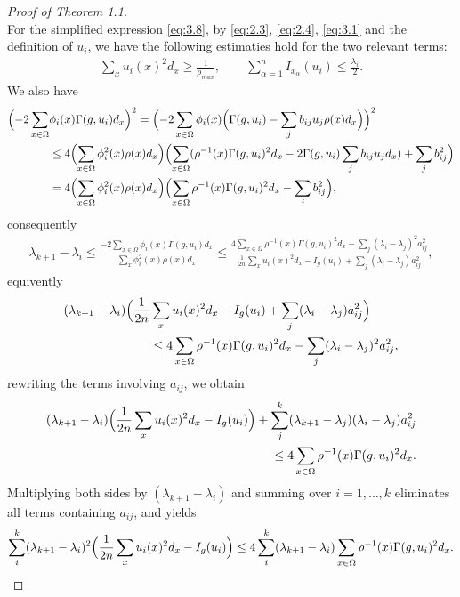 \documentclass[11pt]{article}
\theoremstyle{definition}
\theoremstyle{remark}
\numberwithin{equation}{section}
\begin{document}
\begin{proof}[Proof of Theorem 1.1]
\[\]
For the simplified expression \eqref{eq:3.8}, by \eqref{eq:2.3}, \eqref{eq:2.4}, \eqref{eq:3.1} and the definition of $u_i$, we have the following estimaties hold for the two relevant terms:
\begin{align}\label{eq:3.9}
\sum_{x}u_i(x)^2d_x \ge \frac{1}{\rho_{max}},\qquad \sum_{\alpha =1}^{n}I_{x_\alpha}(u_i) \le \frac{\lambda_i}{2}.
\end{align}
We also have
\begin{align}
\Bigl(-2\sum_{x\in \Omega}&\phi_i(x)\Gamma(g,u_i)d_x\Bigr)^2=\Bigl(-2\sum_{x\in\Omega}\phi_i(x)\Bigl(\Gamma(g,u_i)-\sum_{j}b_{ij}u_j\rho(x)d_x\Bigr)\Bigr)^2\notag\\
&\le 4\Bigl(\sum_{x\in\Omega}\phi_i^2(x)\rho(x)d_x\Bigr)\Bigl(\sum_{x\in\Omega}(\rho^{-1}(x)\Gamma(g,u_i)^2d_x-2\Gamma(g,u_i)\sum_{j}b_{ij}u_jd_x)+\sum_{j}b_{ij}^2\Bigr)\notag\\
&=4\Bigl(\sum_{x\in\Omega}\phi_i^2(x)\rho(x)d_x\Bigr)\Bigl(\sum_{x\in\Omega}\rho^{-1}(x)\Gamma(g,u_i)^2d_x-\sum_{j}b_{ij}^2\Bigr),
\end{align}
consequently\begin{align}\lambda_{k+1}-\lambda_{i}\le \frac{-2\sum_{x\in \Omega}\phi_i(x)\Gamma(g,u_i)d_x}{\sum_{x}\phi_i^2(x)\rho(x)d_x}
\le \frac{4\sum_{x\in\Omega}\rho^{-1}(x)\Gamma(g,u_i)^2d_x-\sum_{j}(\lambda_i-\lambda_j)^2a_{ij}^2}
{\frac{1}{2n}\sum_{x}u_i(x)^2d_x-I_g(u_i)+\sum_{j}(\lambda_i-\lambda_j)a_{ij}^2},\end{align}
equivently\begin{align}(\lambda_{k+1}-\lambda_{i})\Bigl(\frac{1}{2n}&\sum_{x}u_i(x)^2d_x-I_g(u_i)+\sum_{j}(\lambda_i-\lambda_j)a_{ij}^2\Bigr)
\notag\\&\le 4\sum_{x\in\Omega}\rho^{-1}(x)\Gamma(g,u_i)^2d_x-\sum_{j}(\lambda_i-\lambda_j)^2a_{ij}^2,\end{align}
\noindent
rewriting the terms involving \(a_{ij}\), we obtain\begin{align}\label{eq:3.13}
  (\lambda_{k+1}-\lambda_{i})\Bigl(\frac{1}{2n}\sum_{x}u_i(x)^2d_x-I_g(u_i)\Bigr)+\sum_{j}^{k}(\lambda_{k+1}-\lambda_{j})(\lambda_i-\lambda_j)a_{ij}^2
\notag\\\le 4\sum_{x\in \Omega}\rho^{-1}(x)\Gamma(g,u_i)^2d_x.\end{align}
Multiplying both sides by \((\lambda_{k+1}-\lambda_i)\) and summing over \(i=1,\dots,k\) eliminates all terms containing \(a_{ij}\), and yields
\begin{align}
\sum_{i}^{k}(\lambda_{k+1}-\lambda_i)^2\Bigl(\frac{1}{2n}\sum_{x}u_i(x)^2d_x-I_g(u_i)\Bigr)\le 4\sum_{i}^{k}(\lambda_{k+1}-\lambda_i)\sum_{x\in \Omega}\rho^{-1}(x)\Gamma(g,u_i)^2d_x.

\end{align}
\end{proof}
\end{document}
